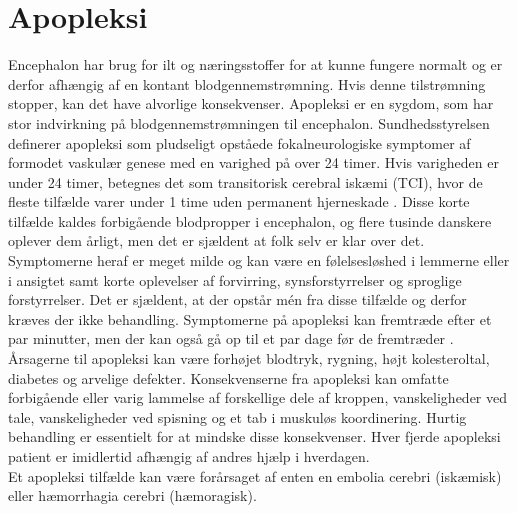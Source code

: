 \section{Apopleksi}
Encephalon har brug for ilt og næringsstoffer for at kunne fungere normalt og er derfor afhængig af en kontant blodgennemstrømning. Hvis denne tilstrømning stopper, kan det have alvorlige konsekvenser. \cite{Hjernesagen2015a} Apopleksi er en sygdom, som har stor indvirkning på blodgennemstrømningen til encephalon. Sundhedsstyrelsen definerer apopleksi som pludseligt opståede fokalneurologiske symptomer af formodet vaskulær genese med en varighed på over 24 timer. \cite{Sundhedsstyrelsen2009} Hvis varigheden er under 24 timer, betegnes det som transitorisk cerebral iskæmi (TCI), hvor de fleste tilfælde varer under 1 time uden permanent hjerneskade \cite{Sundhed.dk2014, Ritter2015}. Disse korte tilfælde kaldes forbigående blodpropper i encephalon, og flere tusinde danskere oplever dem årligt, men det er sjældent at folk selv er klar over det. Symptomerne heraf er meget milde og kan være en følelsesløshed i lemmerne eller i ansigtet samt korte oplevelser af forvirring, synsforstyrrelser og sproglige forstyrrelser. Det er sjældent, at der opstår mén fra disse tilfælde og derfor kræves der ikke behandling. \cite{Hjernesagen2015a,Academic2015} 
Symptomerne på apopleksi kan fremtræde efter et par minutter, men der kan også gå op til et par dage før de fremtræder \cite{Kruuse2014, Academic2015}. 
Årsagerne til apopleksi kan være forhøjet blodtryk, rygning, højt kolesteroltal, diabetes og arvelige defekter. Konsekvenserne fra apopleksi kan omfatte forbigående eller varig lammelse af forskellige dele af kroppen, %
vanskeligheder ved tale, vanskeligheder ved spisning og et tab i muskuløs koordinering. \cite{Academic2015} Hurtig behandling er essentielt for at mindske disse konsekvenser. Hver fjerde apopleksi patient er imidlertid afhængig af andres hjælp i hverdagen. \cite{Hjernesagen2015a} \\ %
Et apopleksi tilfælde kan være forårsaget af enten en embolia cerebri (iskæmisk) eller hæmorrhagia cerebri (hæmoragisk). \cite{Ritter2015} 


